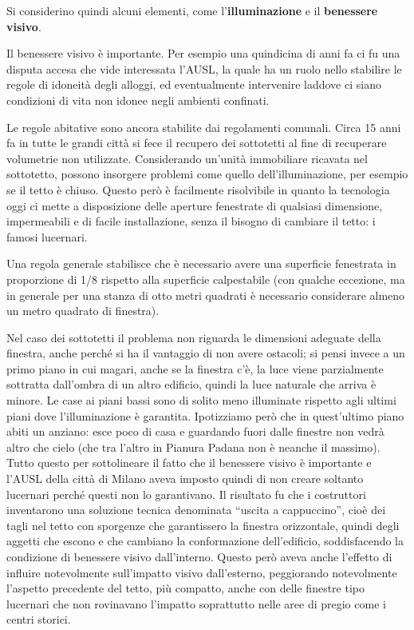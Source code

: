 \documentclass[]{article}
\begin{document}
Si considerino quindi alcuni elementi, come l'\textbf{illuminazione} e
il \textbf{benessere visivo}.

Il benessere visivo è importante. Per esempio una quindicina di anni fa
ci fu una disputa accesa che vide interessata l'AUSL, la quale ha un
ruolo nello stabilire le regole di idoneità degli alloggi, ed
eventualmente intervenire laddove ci siano condizioni di vita non idonee
negli ambienti confinati.

Le regole abitative sono ancora stabilite dai regolamenti comunali.
Circa 15 anni fa in tutte le grandi città si fece il recupero dei
sottotetti al fine di recuperare volumetrie non utilizzate. Considerando
un'unità immobiliare ricavata nel sottotetto, possono insorgere problemi
come quello dell'illuminazione, per esempio se il tetto è chiuso. Questo
però è facilmente risolvibile in quanto la tecnologia oggi ci mette a
disposizione delle aperture fenestrate di qualsiasi dimensione,
impermeabili e di facile installazione, senza il bisogno di cambiare il
tetto: i famosi lucernari.

Una regola generale stabilisce che è necessario avere una superficie
fenestrata in proporzione di 1/8 rispetto alla superficie calpestabile
(con qualche eccezione, ma in generale per una stanza di otto metri
quadrati è necessario considerare almeno un metro quadrato di finestra).

Nel caso dei sottotetti il problema non riguarda le dimensioni adeguate
della finestra, anche perché si ha il vantaggio di non avere ostacoli;
si pensi invece a un primo piano in cui magari, anche se la finestra
c'è, la luce viene parzialmente sottratta dall'ombra di un altro
edificio, quindi la luce naturale che arriva è minore. Le case ai piani
bassi sono di solito meno illuminate rispetto agli ultimi piani dove
l'illuminazione è garantita. Ipotizziamo però che in quest'ultimo piano
abiti un anziano: esce poco di casa e guardando fuori dalle finestre non
vedrà altro che cielo (che tra l'altro in Pianura Padana non è neanche
il massimo). Tutto questo per sottolineare il fatto che il benessere
visivo è importante e l'AUSL della città di Milano aveva imposto quindi
di non creare soltanto lucernari perché questi non lo garantivano. Il
risultato fu che i costruttori inventarono una soluzione tecnica
denominata ``uscita a cappuccino'', cioè dei tagli nel tetto con
sporgenze che garantissero la finestra orizzontale, quindi degli aggetti
che escono e che cambiano la conformazione dell'edificio, soddisfacendo
la condizione di benessere visivo dall'interno. Questo però aveva anche
l'effetto di influire notevolmente sull'impatto visivo dall'esterno,
peggiorando notevolmente l'aspetto precedente del tetto, più compatto,
anche con delle finestre tipo lucernari che non rovinavano l'impatto
soprattutto nelle aree di pregio come i centri storici.
\end{document}
